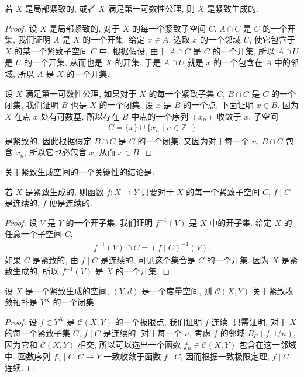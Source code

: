 \documentclass[../../main.tex]{subfiles}
\begin{document}
\begin{lemma}\label{lemma:ch07-compactly-generated}
若 $X$ 是局部紧致的, 或者 $X$ 满足第一可数性公理, 则 $X$ 是紧致生成的.
\end{lemma}

\begin{proof}
设 $X$ 是局部紧致的, 对于 $X$ 的每一个紧致子空间 $C$, $A\cap C$ 是 $C$ 的一个开集, 我们证明 $A$ 是 $X$ 的一个开集. 给定 $x\in A$, 选取 $x$ 的一个邻域 $U$, 使它包含于 $X$ 的某一个紧致子空间 $C$ 中. 根据假设, 由于 $A\cap C$ 是 $C$ 的一个开集, 所以 $A\cap U$ 是 $U$ 的一个开集, 从而也是 $X$ 的开集. 于是 $A\cap U$ 就是 $x$ 的一个包含在 $A$ 中的邻域, 所以 $A$ 是 $X$ 的一个开集.

设 $X$ 满足第一可数性公理, 如果对于 $X$ 的每一个紧致子集 $C$, $B\cap C$ 是 $C$ 的一个闭集, 我们证明 $B$ 也是 $X$ 的一个闭集. 设 $x$ 是 $\overline{B}$ 的一个点, 下面证明 $x\in B$. 因为 $X$ 在点 $x$ 处有可数基, 所以存在 $B$ 中点的一个序列 $(x_n)$ 收敛于 $x$. 子空间
\begin{align*}
C=\{x\}\cup\{x_n\mid n\in\mathbb{Z}_+\}
\end{align*}
是紧致的. 因此根据假定 $B\cap C$ 是 $C$ 的一个闭集. 又因为对于每一个 $n$, $B\cap C$ 包含 $x_n$, 所以它也必包含 $x$, 从而 $x\in B$.
\end{proof}

关于紧致生成空间的一个关键性的结论是:

\begin{lemma}\label{lemma:ch07-compactly-generated-continuity}
若 $X$ 是紧致生成的, 则函数 $f\colon X\to Y$ 只要对于 $X$ 的每一个紧致子空间 $C$, $f\mid C$ 是连续的, $f$ 便是连续的.
\end{lemma}

\begin{proof}
设 $V$ 是 $Y$ 的一个开子集, 我们证明 $f^{-1}(V)$ 是 $X$ 中的开子集. 给定 $X$ 的任意一个子空间 $C$,
\begin{align*}
f^{-1}(V)\cap C=(f\mid C)^{-1}(V).
\end{align*}
如果 $C$ 是紧致的, 由 $f\mid C$ 是连续的, 可见这个集合是 $C$ 的一个开集. 因为 $X$ 是紧致生成的, 所以 $f^{-1}(V)$ 是 $X$ 的一个开集.
\end{proof}

\begin{theorem}\label{theorem:ch07-C-closed-compact-convergence}
设 $X$ 是一个紧致生成的空间, $(Y,d)$ 是一个度量空间, 则 $\mathcal{C}(X,Y)$ 关于紧致收敛拓扑是 $Y^X$ 的一个闭集.
\end{theorem}

\begin{proof}
设 $f\in Y^X$ 是 $\mathcal{C}(X,Y)$ 的一个极限点, 我们证明 $f$ 连续. 只需证明, 对于 $X$ 的每一个紧致子集 $C$, $f\mid C$ 是连续的. 对于每一个 $n$, 考虑 $f$ 的邻域 $B_C(f,1/n)$, 因为它和 $\mathcal{C}(X,Y)$ 相交, 所以可以选出一个函数 $f_n\in\mathcal{C}(X,Y)$ 包含在这一邻域中. 函数序列 $f_n\mid C\colon C\to Y$ 一致收敛于函数 $f\mid C$, 因而根据一致极限定理, $f\mid C$ 连续.
\end{proof}
\end{document}
